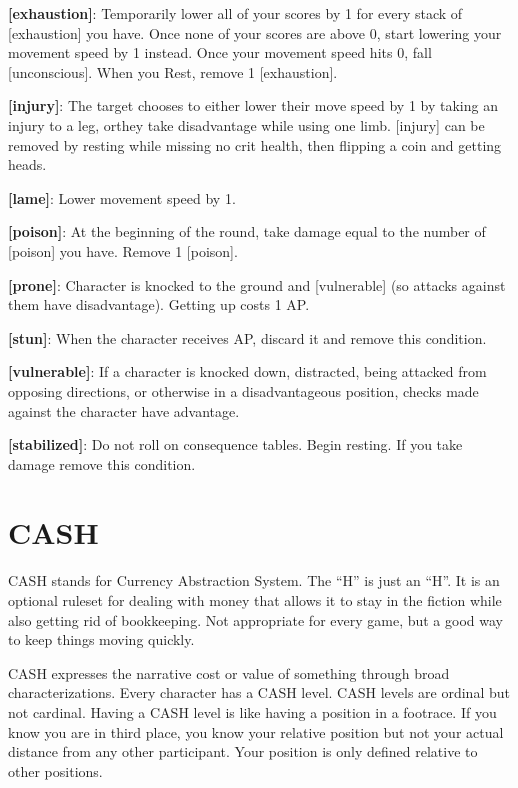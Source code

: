 \documentclass[
  letterpaper,
  DIV=11,
  numbers=noendperiod]{scrartcl}
\begin{document}
\textbf{{[}exhaustion{]}}: Temporarily lower all of your scores by 1 for
every stack of {[}exhaustion{]} you have. Once none of your scores are
above 0, start lowering your movement speed by 1 instead. Once your
movement speed hits 0, fall {[}unconscious{]}. When you Rest, remove 1
{[}exhaustion{]}.

\textbf{{[}injury{]}}: The target chooses to either lower their move
speed by 1 by taking an injury to a leg, orthey take disadvantage while
using one limb. {[}injury{]} can be removed by resting while missing no
crit health, then flipping a coin and getting heads.

\textbf{{[}lame{]}}: Lower movement speed by 1.

\textbf{{[}poison{]}}: At the beginning of the round, take damage equal
to the number of {[}poison{]} you have. Remove 1 {[}poison{]}.

\textbf{{[}prone{]}}: Character is knocked to the ground and
{[}vulnerable{]} (so attacks against them have disadvantage). Getting up
costs 1 AP.

\textbf{{[}stun{]}}: When the character receives AP, discard it and
remove this condition.

\textbf{{[}vulnerable{]}}: If a character is knocked down, distracted,
being attacked from opposing directions, or otherwise in a
disadvantageous position, checks made against the character have
advantage.

\textbf{{[}stabilized{]}}: Do not roll on consequence tables. Begin
resting. If you take damage remove this condition.

\section{CASH}\label{cash}

CASH stands for Currency Abstraction System. The ``H'' is just an ``H''.
It is an optional ruleset for dealing with money that allows it to stay
in the fiction while also getting rid of bookkeeping. Not appropriate
for every game, but a good way to keep things moving quickly.

CASH expresses the narrative cost or value of something through broad
characterizations. Every character has a CASH level. CASH levels are
ordinal but not cardinal. Having a CASH level is like having a position
in a footrace. If you know you are in third place, you know your
relative position but not your actual distance from any other
participant. Your position is only defined relative to other positions.
\end{document}
